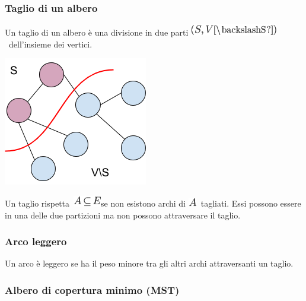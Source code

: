 \documentclass{article}
\begin{document}
\hypertarget{h.rdrr6bsx8ypo}{\subsubsection{\texorpdfstring{{Taglio di
un albero}}{Taglio di un albero}}\label{h.rdrr6bsx8ypo}}

{Un taglio di un albero è una divisione in due parti
}\includegraphics{images/image444.png}{~dell'insieme dei vertici.}

{}

{\includegraphics{images/image527.png}}

{}

{Un taglio }{rispetta}{~}\includegraphics{images/image445.png}{se non
esistono archi di }\includegraphics{images/image73.png}{~tagliati. Essi
possono essere in una delle due partizioni ma non possono attraversare
il taglio.}

\hypertarget{h.gfycwx7ubmbv}{\subsubsection{\texorpdfstring{{Arco
leggero}}{Arco leggero}}\label{h.gfycwx7ubmbv}}

{Un arco è leggero se ha il peso minore tra gli altri archi
attraversanti un taglio.}

\hypertarget{h.1evqcdl7exzv}{\subsubsection{\texorpdfstring{{Albero di
copertura minimo
(MST)}}{Albero di copertura minimo (MST)}}\label{h.1evqcdl7exzv}}
\end{document}
